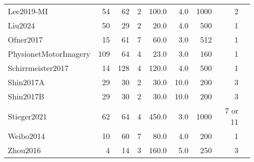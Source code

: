 \begin{tabularx}{\linewidth}{@{}Xrrrrrrrr@{}}
	Lee2019-MI                 & 54              & 62       & 2         & 100.0           & 4.0  & 1000 & 2                 & \cite{Lee2019}           \\
	Liu2024                    & 50              & 29       & 2         & 20.0            & 4.0  & 500  & 1                 & \cite{Liu2024}           \\
	Ofner2017                  & 15              & 61       & 7         & 60.0            & 3.0  & 512  & 1                 & \cite{Ofner2017}         \\
	PhysionetMotorImagery      & 109             & 64       & 4         & 23.0            & 3.0  & 160  & 1                 & \cite{Goldberger2000}    \\
	Schirrmeister2017          & 14              & 128      & 4         & 120.0           & 4.0  & 500  & 1                 & \cite{Schirrmeister2017} \\
	Shin2017A                  & 29              & 30       & 2         & 30.0            & 10.0 & 200  & 3                 & \cite{Shin2016}          \\
	Shin2017B                  & 29              & 30       & 2         & 30.0            & 10.0 & 200  & 3                 & \cite{Shin2016}          \\
	Stieger2021                & 62              & 64       & 4         & 450.0           & 3.0  & 1000 & 7 or 11           & \cite{Stieger2021}       \\
	Weibo2014                  & 10              & 60       & 7         & 80.0            & 4.0  & 200  & 1                 & \cite{Yi2014}            \\
	Zhou2016                   & 4               & 14       & 3         & 160.0           & 5.0  & 250  & 3                 & \cite{Zhou2016}          \\

	\bottomrule
\end{tabularx}
